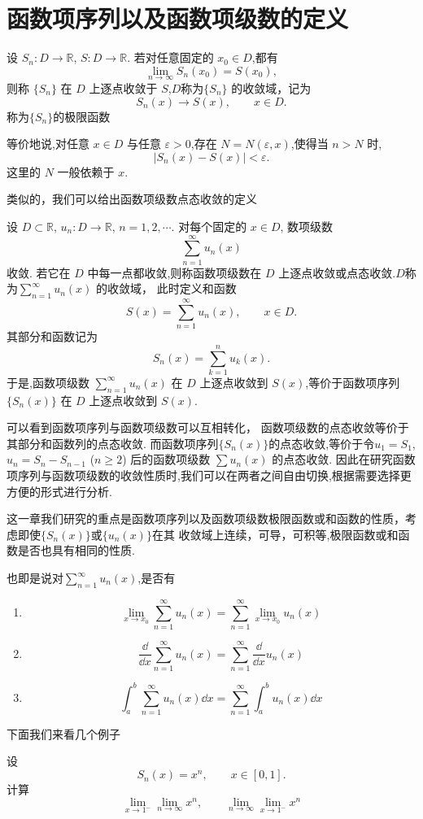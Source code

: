 \section{函数项序列以及函数项级数的定义}


\begin{definition}
	设 $S_n:D\to\mathbb{R}$, $S:D\to\mathbb{R}$. 若对任意固定的 $x_0\in D$,都有
	\[
	\lim_{n\to\infty}S_n(x_0)=S(x_0),
	\]
	则称 $\{S_n\}$ 在 $D$ 上逐点收敛于 $S$,$D$称为$\{S_n\}$ 的收敛域，记为
	\[
	S_n(x)\to S(x),\qquad x\in D.
	\]
	称为$\{S_n\}$的极限函数
	
	等价地说,对任意 $x\in D$ 与任意 $\varepsilon>0$,存在 $N=N(\varepsilon,x)$,使得当 $n>N$ 时,
	\[
	|S_n(x)-S(x)|<\varepsilon.
	\]
	这里的 $N$ 一般依赖于 $x$.
\end{definition}
类似的，我们可以给出函数项级数点态收敛的定义
\begin{definition}
	设 $D\subset \mathbb{R}$, $u_n:D\to \mathbb{R}$, $n=1,2,\cdots$. 对每个固定的 $x\in D$, 数项级数
	\[
	\sum_{n=1}^{\infty}u_n(x)
	\]
	收敛.  若它在 $D$ 中每一点都收敛,则称函数项级数在 $D$ 上逐点收敛或点态收敛.$D$称为$\sum\limits_{n=1}^{\infty}u_n(x)$ 的收敛域， 此时定义和函数
	\[
	S(x)=\sum_{n=1}^{\infty}u_n(x),\qquad x\in D.
	\]
	其部分和函数记为
	\[
	S_n(x)=\sum_{k=1}^{n}u_k(x).
	\]
	于是,函数项级数 $\sum\limits_{n=1}^{\infty}u_n(x)$ 在 $D$ 上逐点收敛到 $S(x)$,等价于函数项序列 $\{S_n(x)\}$ 在 $D$ 上逐点收敛到 $S(x)$.
\end{definition}
可以看到函数项序列与函数项级数可以互相转化，
函数项级数的点态收敛等价于其部分和函数列的点态收敛.
而函数项序列$\{S_n(x)\}$的点态收敛,等价于令$u_1=S_1$, $u_n=S_n-S_{n-1}$ ($n\ge2$) 后的函数项级数 $\sum u_n(x)$ 的点态收敛.
因此在研究函数项序列与函数项级数的收敛性质时,我们可以在两者之间自由切换,根据需要选择更方便的形式进行分析.

这一章我们研究的重点是函数项序列以及函数项级数极限函数或和函数的性质，考虑即使$\{S_n(x)\}$或$\{u_n(x)\}$在其
收敛域上连续，可导，可积等,极限函数或和函数是否也具有相同的性质. 

也即是说对$\sum\limits_{n=1}^{\infty}u_n(x)$,是否有
\begin{enumerate}
	\item \[\lim\limits_{x\to x_0}\sum_{n=1}^{\infty}u_n(x)=\sum_{n=1}^{\infty}\lim\limits_{x\to x_0}u_n(x)\]
	\item \[\frac{\dd}{\dd x}\sum_{n=1}^{\infty}u_n(x)= \sum_{n=1}^{\infty}\frac{\dd}{\dd x}u_n(x)\]
	\item \[\int_{a}^{b}\sum_{n=1}^{\infty}u_n(x) \dd x = \sum_{n=1}^{\infty}\int_{a}^{b}u_n(x) \dd x\]
\end{enumerate}
下面我们来看几个例子
\begin{example}
	设
	\[
	S_n(x)=x^n,
	\qquad x\in[0,1].
	\]
	计算
	\[
	\lim_{x\to1^-}\lim_{n\to\infty}x^n,
	\qquad
	\lim_{n\to\infty}\lim_{x\to1^-}x^n
	\]
\end{example}

